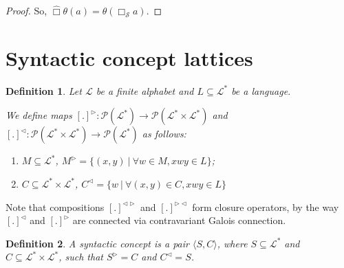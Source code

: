 \documentclass[a4paper]{article}
\theoremstyle{defin}
\newtheorem{defin}{Definition}
\theoremstyle{theorem}
\theoremstyle{prop}
\theoremstyle{lemma}
\theoremstyle{ex}
\theoremstyle{col}
\begin{document}
\begin{proof}
So, $\hat{\Box} \theta(a) = \theta(\Box_{\mathcal{S}} a)$.

\end{proof}

\section{Syntactic concept lattices}

\begin{defin}
  Let $\mathcal{L}$ be a finite alphabet and $L \subseteq \mathcal{L}^{*}$ be a language.

  We define maps $[.]^{\triangleright} : \mathcal{P}(\mathcal{L}^{*}) \to \mathcal{P}(\mathcal{L}^{*} \times \mathcal{L}^{*})$
  and $[.]^{\triangleleft} : \mathcal{P}(\mathcal{L}^{*} \times \mathcal{L}^{*}) \to \mathcal{P}(\mathcal{L}^{*})$ as follows:

  \begin{enumerate}
    \item $M \subseteq \mathcal{L}^{*}$, $M^{\triangleright} = \{ (x, y) \: | \: \forall w \in M, x w y \in L \}$;
    \item $C \subseteq \mathcal{L}^{*} \times \mathcal{L}^{*}$, $C^{\triangleleft} = \{ w \: | \: \forall (x, y) \in C, x w y
    \in L\}$
  \end{enumerate}
\end{defin}

Note that compositions $[.]^{\triangleleft \triangleright}$ and $[.]^{\triangleright \triangleleft}$ form closure operators,
by the way $[.]^{\triangleleft}$ and $[.]^{\triangleright}$ are connected via contravariant Galois connection.

\begin{defin} A syntactic concept is a pair $\langle S, C \rangle$, where $S \subseteq \mathcal{L}^{*}$
  and $C \subseteq \mathcal{L}^{*} \times \mathcal{L}^{*}$, such that $S^{\triangleright} = C$ and $C^{\triangleleft} = S$.
\end{defin}
\end{document}
